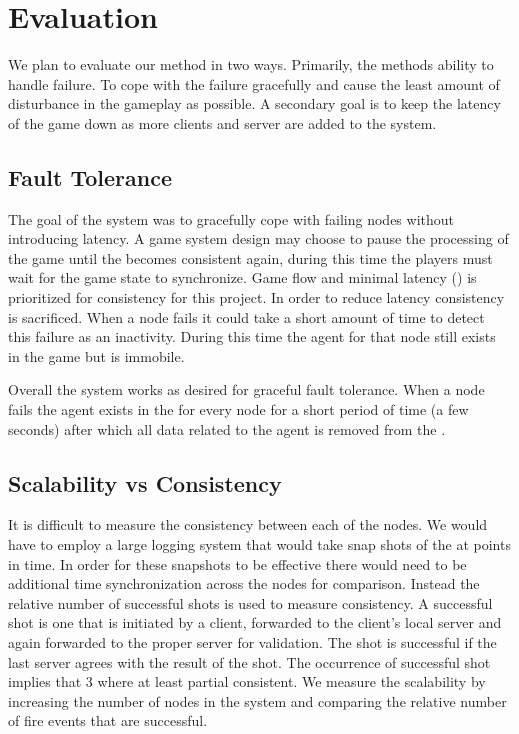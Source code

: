 

\section{Evaluation}
\label{sec:evaluation}

We plan to evaluate our method in two ways. Primarily, the methods ability to handle failure. To cope with the failure gracefully and cause the least amount of disturbance in the gameplay as possible. A secondary goal is to keep the latency of the game down as more clients and server are added to the system.

\subsection{Fault Tolerance}

The goal of the system was to gracefully cope with failing nodes without introducing latency. 
A game system design may choose to pause the processing of the game until the \gamestate becomes consistent again, during this time the players must wait for the game state to synchronize.
Game flow and minimal latency () is prioritized for consistency for this project.
In order to reduce latency consistency is sacrificed. 
When a node fails it could take a short amount of time to detect this failure as an inactivity.
During this time the agent for that node still exists in the game but is immobile.

Overall the system works as desired for graceful fault tolerance.
When a node fails the agent exists in the \gamestate for every node for a short period of time (a few seconds) after which all data related to the agent is removed from the \gamestate.

\subsection{Scalability vs Consistency}

It is difficult to measure the consistency between each of the nodes. 
We would have to employ a large logging system that would take snap shots of the \gamestate at points in time. 
In order for these snapshots to be effective there would need to be additional time synchronization across the nodes for comparison. 
Instead the relative number of successful shots is used to measure consistency. 
A successful shot is one that is initiated by a client, forwarded to the client's local server and again forwarded to the proper server for validation. 
The shot is successful if the last server agrees with the result of the shot. 
The occurrence of successful shot implies that $3$ \gamestates where at least partial consistent.
We measure the scalability by increasing the number of nodes in the system and comparing the relative number of fire events that are successful. 

